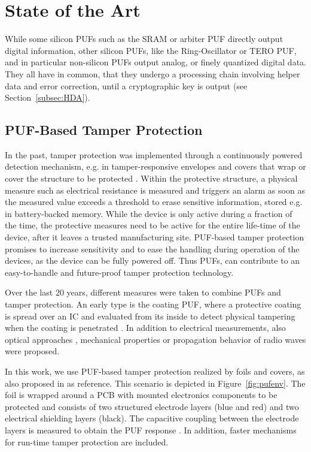 \section{State of the Art}\label{sec:sota}

While some silicon PUFs such as the SRAM or arbiter PUF directly output digital information, other silicon PUFs, like the Ring-Oscillator or TERO PUF, and in particular non-silicon PUFs output analog, or finely quantized digital data. They all have in common, that they undergo a processing chain involving helper data and error correction, until a cryptographic key is output (see Section~\ref{subsec:HDA}).

\subsection{PUF-Based Tamper Protection}\label{subsec:puf-basedtampprot}

In the past, tamper protection was implemented through a continuously powered detection mechanism, e.g. in tamper-responsive envelopes and covers that wrap or cover the structure to be protected \cite{IMFC13,OI18b}. Within the protective structure, a physical measure such as electrical resistance is measured and triggers an alarm as soon as the measured value exceeds a threshold to erase sensitive information, stored e.g. in battery-backed memory. While the device is only active during a fraction of the time, the protective measures need to be active for the entire life-time of the device, after it leaves a trusted manufacturing site. PUF-based tamper protection promises to increase sensitivity and to ease the handling during operation of the devices, as the device can be fully powered off. Thus PUFs, can contribute to an easy-to-handle and future-proof tamper protection technology.

Over the last 20 years, different measures were taken to combine PUFs and tamper protection. An early type is the coating PUF, where a protective coating is spread over an IC and evaluated from its inside to detect physical tampering when the coating is penetrated \cite{SMKT06,TSS+06}. In addition to electrical measurements, also optical approaches \cite{esbach2012new,vai2015secure}, mechanical properties \cite{GS22} or propagation behavior of radio waves \cite{STZP22} were proposed.

In this work, we use PUF-based tamper protection realized by foils and covers, as also proposed in \cite{IOK+18,Imm19,ION+19,GOFK21} as reference. This scenario is depicted in Figure~\ref{fig:pufenv}. The foil is wrapped around a PCB with mounted electronics components to be protected and consists of two structured electrode layers (blue and red) and two electrical shielding layers (black). The capacitive coupling between the electrode layers is measured to obtain the PUF response \cite{OIHS18}. In addition, faster mechanisms for run-time tamper protection are included.

